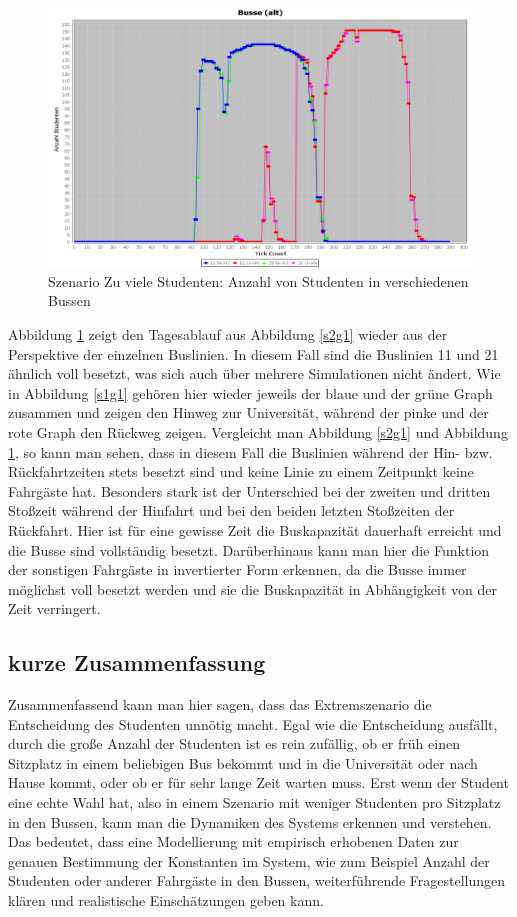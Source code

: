 \documentclass[12pt,a4paper]{scrartcl}
\begin{document}
\begin{figure}
\includegraphics[scale=0.4]{Viele_Studenten_Busse.png}
\caption{Szenario \glqq Zu viele Studenten\grqq : Anzahl von Studenten in verschiedenen Bussen}
\label{s2g2}
\end{figure}

Abbildung \ref{s2g2} zeigt den Tagesablauf aus Abbildung \ref{s2g1} wieder aus der Perspektive der einzelnen Buslinien. In diesem Fall sind die Buslinien 11 und 21 ähnlich voll besetzt, was sich auch über mehrere Simulationen nicht ändert. Wie in Abbildung \ref{s1g1} gehören hier wieder jeweils der blaue und der grüne Graph zusammen und zeigen den Hinweg zur Universität, während der pinke und der rote Graph den Rückweg zeigen. Vergleicht man Abbildung \ref{s2g1} und Abbildung \ref{s2g2}, so kann man sehen, dass in diesem Fall die Buslinien während der Hin- bzw. Rückfahrtzeiten stets besetzt sind und keine Linie zu einem Zeitpunkt keine Fahrgäste hat. Besonders stark ist der Unterschied bei der zweiten und dritten Stoßzeit während der Hinfahrt und bei den beiden letzten Stoßzeiten der Rückfahrt. Hier ist für eine gewisse Zeit die Buskapazität dauerhaft erreicht und die Busse sind vollständig besetzt. Darüberhinaus kann man hier die Funktion der sonstigen Fahrgäste in invertierter Form erkennen, da die Busse immer möglichst voll besetzt werden und sie die Buskapazität in Abhängigkeit von der Zeit verringert.


\subsection{kurze Zusammenfassung}\label{graphenzsm}
Zusammenfassend kann man hier sagen, dass das Extremszenario die Entscheidung des Studenten unnötig macht. Egal wie die Entscheidung ausfällt, durch die große Anzahl der Studenten ist es rein zufällig, ob er früh einen Sitzplatz in einem beliebigen Bus bekommt und in die Universität oder nach Hause kommt, oder ob er für sehr lange Zeit warten muss. Erst wenn der Student eine echte Wahl hat, also in einem Szenario mit weniger Studenten pro Sitzplatz in den Bussen, kann man die Dynamiken des Systems erkennen und verstehen. Das bedeutet, dass eine Modellierung mit empirisch erhobenen Daten zur genauen Bestimmung der Konstanten im System, wie zum Beispiel Anzahl der Studenten oder anderer Fahrgäste in den Bussen, weiterführende Fragestellungen klären und realistische Einschätzungen geben kann.
\end{document}
